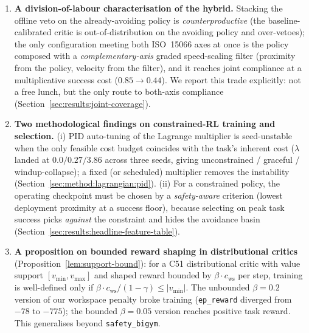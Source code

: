 \documentclass[11pt,a4paper]{report}
\newcommand{\iso}{ISO~15066}
\newcommand{\sbigym}{\texttt{safety\_bigym}}
\begin{document}
\begin{enumerate}[label=\textbf{C\arabic*.}, leftmargin=2em]
{whereas proactive constrained RL resolves it.} A reactive filter faces
a freeze-versus-flee dilemma, and $\approx$42\,\% of close proximity is
exogenous (the coworker approaching a stationary robot), a floor no
robot-action veto can remove. We establish this across the
\emph{complete} reactive-filter taxonomy (learned veto, model-based
base-dodge, end-effector retract, graded speed-scaling), none of which
reaches a graceful operating point
(Sections~\ref{sec:results:filter-pareto},
\ref{sec:results:reactive-taxonomy}). A fixed-multiplier Lagrangian
policy instead reduces \texttt{ep\_proximity\_violation\_rate} by
$22.8\,\%$ (0.296 to 0.228) at $0.76$ task success, reproducibly across
three seeds (Experiment~E4.1,
Section~\ref{sec:results:headline-feature-table}).
\item \textbf{A division-of-labour characterisation of the hybrid.}
Stacking the offline veto on the already-avoiding policy is
\emph{counterproductive} (the baseline-calibrated critic is
out-of-distribution on the avoiding policy and over-vetoes); the only
configuration meeting both \iso{} axes at once is the policy composed
with a \emph{complementary-axis} graded speed-scaling filter (proximity
from the policy, velocity from the filter), and it reaches joint
compliance at a multiplicative success cost
($0.85 \rightarrow 0.44$). We report this trade explicitly: not a free
lunch, but the only route to both-axis compliance
(Section~\ref{sec:results:joint-coverage}).
\item \textbf{Two methodological findings on constrained-RL training
and selection.} (i) PID auto-tuning of the Lagrange multiplier is
seed-unstable when the only feasible cost budget coincides with the
task's inherent cost ($\lambda$ landed at $0.0/0.27/3.86$ across three
seeds, giving unconstrained / graceful / windup-collapse); a fixed (or
scheduled) multiplier removes the instability
(Section~\ref{sec:method:lagrangian:pid}). (ii) For a constrained
policy, the operating checkpoint must be chosen by a
\emph{safety-aware} criterion (lowest deployment proximity at a success
floor), because selecting on peak task success picks \emph{against} the
constraint and hides the avoidance basin
(Section~\ref{sec:results:headline-feature-table}).
\item \textbf{A proposition on bounded reward shaping in distributional
critics} (Proposition~\ref{lem:support-bound}): for a C51 distributional
critic with value support $[v_{\min}, v_{\max}]$ and shaped reward
bounded by $\beta \cdot c_{\mathrm{ws}}$ per step, training is
well-defined only if
$\beta \cdot c_{\mathrm{ws}} / (1-\gamma) \le |v_{\min}|$. The
unbounded $\beta = 0.2$ version of our workspace penalty broke training
(\texttt{ep\_reward} diverged from $-78$ to $-775$); the bounded
$\beta = 0.05$ version reaches positive task reward. This generalises
beyond \sbigym{}.
\end{enumerate}
\end{document}
